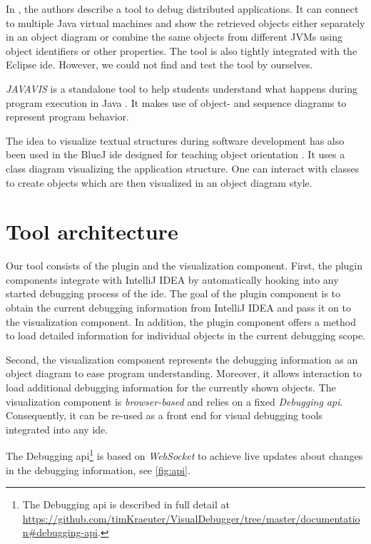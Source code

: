 \documentclass[conference]{IEEEtran}
\newcommand{\intellij}{IntelliJ IDEA}
\begin{document}
In \cite{kochGraphicalDebuggingDistributed2015}, the authors describe a tool to debug distributed applications.
It can connect to multiple Java virtual machines and show the retrieved objects either separately in an object diagram or combine the same objects from different JVMs using object identifiers or other properties.
The tool is also tightly integrated with the Eclipse \gls*{ide}.
However, we could not find and test the tool by ourselves.

\textit{JAVAVIS} is a standalone tool to help students understand what happens during program execution in Java \cite{oechsleJAVAVISAutomaticProgram2002}.
It makes use of object- and sequence diagrams to represent program behavior.

The idea to visualize textual structures during software development has also been used in the BlueJ \gls*{ide} designed for teaching object orientation \cite{kollingBlueJSystemIts2003,kollingObjectorientedProgramDevelopment1996}.
It uses a class diagram visualizing the application structure.
One can interact with classes to create objects which are then visualized in an object diagram style.

\section{Tool architecture}
Our tool consists of the plugin and the visualization component.
First, the plugin components integrate with \intellij{} by automatically hooking into any started debugging process of the \gls*{ide}.
The goal of the plugin component is to obtain the current debugging information from \intellij{} and pass it on to the visualization component.
In addition, the plugin component offers a method to load detailed information for individual objects in the current debugging scope.

Second, the visualization component represents the debugging information as an object diagram to ease program understanding.
Moreover, it allows interaction to load additional debugging information for the currently shown objects.
The visualization component is \emph{browser-based} and relies on a fixed \emph{Debugging \gls*{api}}.
Consequently, it can be re-used as a front end for visual debugging tools integrated into any \gls*{ide}.

The Debugging \gls*{api}\footnote{The Debugging \gls*{api} is described in full detail at \url{https://github.com/timKraeuter/VisualDebugger/tree/master/documentation\#debugging-api}.} is based on \emph{WebSocket} to achieve live updates about changes in the debugging information, see \autoref{fig:api}.
\end{document}
